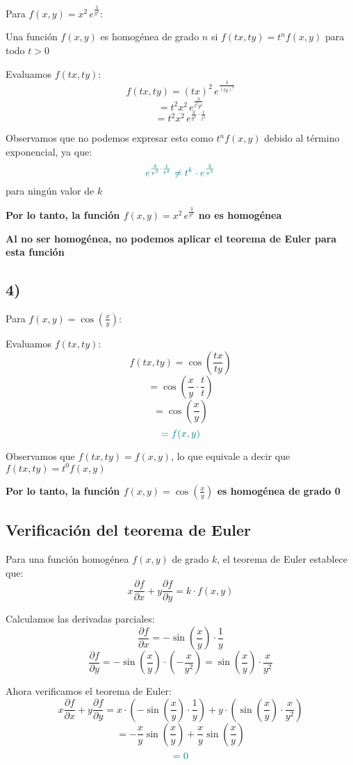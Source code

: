 \documentclass{article}
\begin{document}
Para \(f(x,y) = x^2\,e^{\frac{3}{y^2}}\):

Una función \(f(x,y)\) es homogénea de grado \(n\) si \(f(tx,ty) = t^n f(x,y)\) para todo \(t > 0\)

Evaluamos \(f(tx,ty)\):
\[
f(tx,ty) = (tx)^2\,e^{\frac{3}{(ty)^2}}
\]
\[
= t^2x^2\,e^{\frac{3}{t^2y^2}}
\]
\[
= t^2x^2\,e^{\frac{3}{y^2} \cdot \frac{1}{t^2}}
\]

Observamos que no podemos expresar esto como \(t^n f(x,y)\) debido al término exponencial, ya que:
\[
\color{teal}
e^{\frac{3}{y^2} \cdot \frac{1}{t^2}} \neq t^k \cdot e^{\frac{3}{y^2}}
\]
para ningún valor de \(k\)

\textbf{\color{teal}Por lo tanto, la función \(f(x,y) = x^2\,e^{\frac{3}{y^2}}\) no es homogénea}

\textbf{\color{teal}Al no ser homogénea, no podemos aplicar el teorema de Euler para esta función}

\subsection*{4)}

Para \(f(x,y) = \cos\left(\frac{x}{y}\right)\):

Evaluamos \(f(tx,ty)\):
\[
f(tx,ty) = \cos\left(\frac{tx}{ty}\right)
\]
\[
= \cos\left(\frac{x}{y} \cdot \frac{t}{t}\right)
\]
\[
= \cos\left(\frac{x}{y}\right)
\]
\[
\color{teal}
= f(x,y)
\]

Observamos que \(f(tx,ty) = f(x,y)\), lo que equivale a decir que \(f(tx,ty) = t^0 f(x,y)\)

\textbf{\color{teal}Por lo tanto, la función \(f(x,y) = \cos\left(\frac{x}{y}\right)\) es homogénea de grado 0}

\subsection*{Verificación del teorema de Euler}

Para una función homogénea \(f(x,y)\) de grado \(k\), el teorema de Euler establece que:
\[
x\frac{\partial f}{\partial x} + y\frac{\partial f}{\partial y} = k \cdot f(x,y)
\]

Calculamos las derivadas parciales:
\[
\frac{\partial f}{\partial x} = -\sin\left(\frac{x}{y}\right) \cdot \frac{1}{y}
\]
\[
\frac{\partial f}{\partial y} = -\sin\left(\frac{x}{y}\right) \cdot \left(-\frac{x}{y^2}\right) = \sin\left(\frac{x}{y}\right) \cdot \frac{x}{y^2}
\]

Ahora verificamos el teorema de Euler:
\[
x\frac{\partial f}{\partial x} + y\frac{\partial f}{\partial y}
= x \cdot \left(-\sin\left(\frac{x}{y}\right) \cdot \frac{1}{y}\right) + y \cdot \left(\sin\left(\frac{x}{y}\right) \cdot \frac{x}{y^2}\right)
\]
\[
= -\frac{x}{y}\sin\left(\frac{x}{y}\right) + \frac{x}{y}\sin\left(\frac{x}{y}\right)
\]
\[
\color{teal}
= 0
\]
\end{document}
